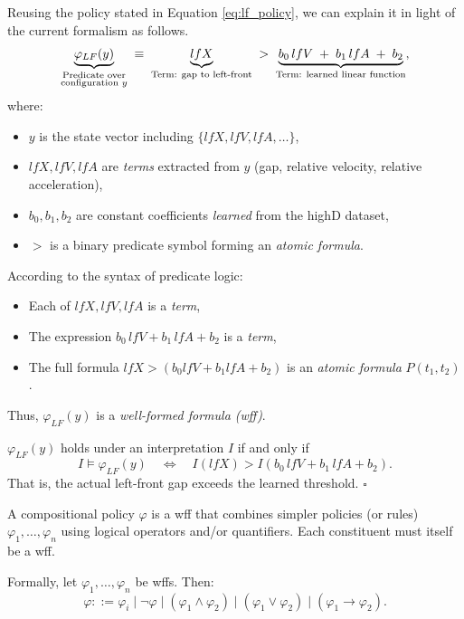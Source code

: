 \begin{example}
\label{example:lf_policy_logic}

Reusing the policy stated in Equation \ref{eq:lf_policy}, we can explain it in light of the current formalism as follows.
\begin{equation}
 \underbrace{\varphi_{LF}(y)}_{\substack{\text{Predicate over}\\\text{configuration }y}}
 \;\equiv\;
 \underbrace{lfX}_{\text{Term: gap to left-front}}
 \;>\;
 \underbrace{b_0\vphantom{lfX}\,lfV 
 \;+\;b_1\,lfA 
 \;+\;b_2}_{\text{Term: learned linear function}},
  \label{eq:lf_policy_2}
\end{equation}
where:
\begin{itemize}
  \item $y$ is the state vector including $\{lfX,lfV,lfA,\dots\}$,
  \item $lfX,lfV,lfA$ are \emph{terms} extracted from $y$ (gap, relative velocity, relative acceleration),
  \item $b_0,b_1,b_2$ are constant coefficients \emph{learned} from the highD dataset,
  \item $>$ is a binary predicate symbol forming an \emph{atomic formula}.
\end{itemize}

According to the syntax of predicate logic:
\begin{itemize}
  \item Each of $lfX,lfV,lfA$ is a \emph{term},
  \item The expression $b_0\,lfV + b_1\,lfA + b_2$ is a \emph{term},
  \item The full formula $lfX > (b_0 lfV + b_1 lfA + b_2)$ is an \emph{atomic formula} $P(t_1,t_2)$.
\end{itemize}

Thus, $\varphi_{LF}(y)$ is a \emph{well-formed formula (wff)}.

$\varphi_{LF}(y)$ holds under an interpretation $I$ if and only if
\[
 I \models \varphi_{LF}(y)
 \quad\Longleftrightarrow\quad
 I(lfX) > I(b_0\,lfV + b_1\,lfA + b_2).
\]
That is, the actual left-front gap exceeds the learned threshold. $\square$
\end{example}


\begin{definition}
\label{def:compositional_policy}
A compositional policy $\varphi$ is a wff that combines simpler policies (or rules) $\varphi_1,\dots,\varphi_n$ using logical operators and/or quantifiers. Each constituent must itself be a wff.

Formally, let $\varphi_1,\dots,\varphi_n$ be wffs.  Then:
\[
 \varphi ::= \varphi_i
 \mid \lnot \varphi
 \mid (\varphi_1 \land \varphi_2)
 \mid (\varphi_1 \lor \varphi_2)
 \mid (\varphi_1 \rightarrow \varphi_2).
\]
\end{definition}


